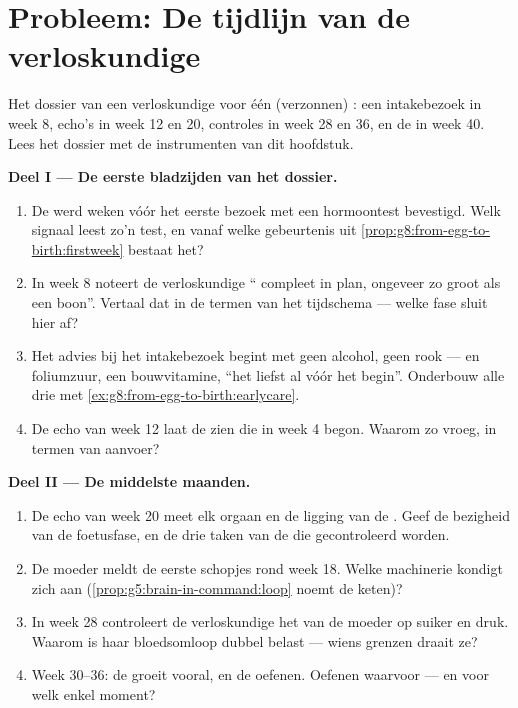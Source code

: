 \section{Probleem: De tijdlijn van de verloskundige}

\begin{problem}\label{pb:g8:from-egg-to-birth:1}
Het dossier van een verloskundige voor één (verzonnen) : een
intakebezoek in week 8, echo's in week 12 en 20, controles in week 28 en
36, en de  in week 40. Lees het dossier met de instrumenten van
dit hoofdstuk.

\medskip\noindent\textbf{Deel I --- De eerste bladzijden van het
dossier.}
\begin{enumerate}
  \item De  werd weken vóór het eerste bezoek met een
        hormoontest bevestigd. Welk signaal leest zo'n test, en vanaf welke
        gebeurtenis uit
        \cref{prop:g8:from-egg-to-birth:firstweek} bestaat het?
  \item In week 8 noteert de verloskundige `` compleet in plan,
        ongeveer zo groot als een boon''. Vertaal dat in de termen van het
        tijdschema --- welke fase sluit hier af?
  \item Het advies bij het intakebezoek begint met geen alcohol, geen rook
        --- en foliumzuur, een bouwvitamine, ``het liefst al vóór het
        begin''. Onderbouw alle drie met
        \cref{ex:g8:from-egg-to-birth:earlycare}.
  \item De echo van week 12 laat de  zien die in week 4 begon.
        Waarom zo vroeg, in termen van aanvoer?
\end{enumerate}

\medskip\noindent\textbf{Deel II --- De middelste maanden.}
\begin{enumerate}[resume]
  \item De echo van week 20 meet elk orgaan en de ligging van de .
        Geef de bezigheid van de foetusfase, en de drie taken van de
         die gecontroleerd worden.
  \item De moeder meldt de eerste schopjes rond week 18. Welke machinerie
        kondigt zich aan (\cref{prop:g5:brain-in-command:loop} noemt de
        keten)?
  \item In week 28 controleert de verloskundige het  van de moeder op
        suiker en druk. Waarom is haar bloedsomloop dubbel belast ---
        wiens grenzen draait ze?
  \item Week 30--36: de  groeit vooral, en de  oefenen.
        Oefenen waarvoor --- en voor welk enkel moment?
\end{enumerate}


\end{problem}
